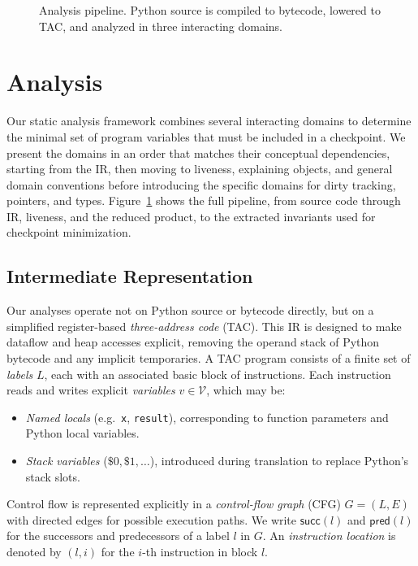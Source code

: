 \begin{figure}[t]
    \centering
    
    \caption{Analysis pipeline. Python source is compiled to bytecode, lowered to TAC, and analyzed in three interacting domains.}
    \label{fig:overview}
\end{figure}

\section{Analysis}
\label{sec:analysis}

Our static analysis framework combines several interacting domains to determine the minimal set of program variables that must be included in a checkpoint.  
We present the domains in an order that matches their conceptual dependencies, starting from the IR, then moving to liveness, explaining objects, and general domain conventions before introducing the specific domains for dirty tracking, pointers, and types. Figure~\ref{fig:overview} shows the full pipeline, from source code through IR, liveness, and the reduced product, to the extracted invariants used for checkpoint minimization.

\subsection{Intermediate Representation}
Our analyses operate not on Python source or bytecode directly, but on a simplified register-based \emph{three-address code} (TAC).
This IR is designed to make dataflow and heap accesses explicit, removing the operand stack of Python bytecode and any implicit temporaries.
A TAC program consists of a finite set of \emph{labels} $L$, each with an associated basic block of instructions.
Each instruction reads and writes explicit \emph{variables} $v \in \mathcal{V}$, which may be:
\begin{itemize}
    \item \emph{Named locals} (e.g.\ \texttt{x}, \texttt{result}), corresponding to function parameters and Python local variables.
    \item \emph{Stack variables} ($\$0, \$1, \ldots$), introduced during translation to replace Python's stack slots.
\end{itemize}
Control flow is represented explicitly in a \emph{control-flow graph} (CFG) $G = (L, E)$ with directed edges for possible execution paths.
We write $\mathsf{succ}(l)$ and $\mathsf{pred}(l)$ for the successors and predecessors of a label $l$ in $G$.
An \emph{instruction location} is denoted by $(l, i)$ for the $i$-th instruction in block $l$.
